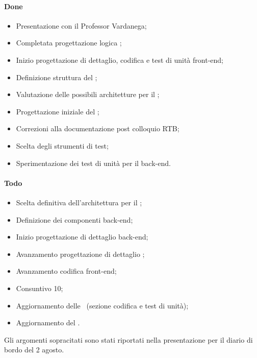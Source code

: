 \paragraph{Done}
\begin{itemize}
	\item Presentazione  con il Professor Vardanega;
	\item Completata progettazione logica ;
	\item Inizio progettazione di dettaglio, codifica e test di unità front-end;
	\item Definizione struttura del \MU;
	\item Valutazione delle possibili architetture per il ;
	\item Progettazione iniziale del ;
	\item Correzioni alla documentazione post colloquio RTB;
	\item Scelta degli strumenti di test;
	\item Sperimentazione dei test di unità per il back-end.
\end{itemize}

\paragraph{Todo}
\begin{itemize}
	\item Scelta definitiva dell'architettura per il ;
	\item Definizione dei componenti back-end;
	\item Inizio progettazione di dettaglio back-end;
	\item Avanzamento progettazione di dettaglio ;
	\item Avanzamento codifica front-end;
	\item Consuntivo  10;
	\item Aggiornamento delle \NdP\ (sezione codifica e test di unità);
	\item Aggiornamento del \PdQ.
\end{itemize}

\vspace{0.5\baselineskip}
\par Gli argomenti sopracitati sono stati riportati nella presentazione per il diario di bordo del 2 agosto.